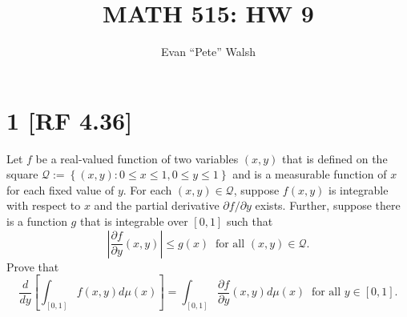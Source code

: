 \documentclass[12pt]{article}
\title{MATH 515: HW 9}
\author{Evan ``Pete'' Walsh}
\begin{document}

\section*{1 [RF 4.36]}
Let $f$ be a real-valued function of two variables $(x,y)$ that is defined on the square $\mathcal{Q} := \left\{ (x,y) : 0 \leq x \leq 1, 0\leq y \leq
1 \right\}$ and is a measurable function of $x$ for each fixed value of $y$. For each $(x,y) \in \mathcal{Q}$, suppose $f(x,y)$ is 
integrable with respect to $x$ and the partial derivative $\partial f / \partial y$ exists. Further, suppose there is a function $g$ that is 
integrable over $[0,1]$ such that 
\[ \left| \frac{\partial f}{\partial y}(x,y)\right| \leq g(x) \ \text{ for all }(x,y) \in \mathcal{Q}. \]
Prove that 
\[ \frac{d}{dy}\left[ \int_{[0,1]}f(x,y)d\mu(x) \right] = \int_{[0,1]}\frac{\partial f}{\partial y}(x,y)d\mu(x) \ \text{ for all }y \in [0,1]. \]
\end{document}
